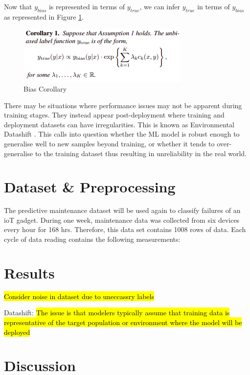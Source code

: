 \documentclass[a4paper,12pt]{report}
\begin{document}
Now that $y_{bias}$ is represented in terms of $y_{true}$, we can infer $y_{true}$ in terms of $y_{bias}$ as represented in Figure \ref{fig:Corollary}.

\begin{figure}[h]
    \includegraphics[scale =0.8]{corollary.png}
    \centering
    \caption{Bias Corollary \cite{Jiang}}
    \label{fig:Corollary}
\end{figure}

There may be situations where performance issues may not be apparent during training stages. 
They instead appear post-deployment where training and deployment datasets can have irregularities. 
This is known as Environmental Datashift \cite{saria2019tutorial}. 
This calls into question whether the ML model is robust enough to generalise well to new samples beyond training, or whether it tends to over-generalise to the training dataset thus resulting in unreliability in the real world.


\section{Dataset \& Preprocessing}
The predictive maintenance dataset will be used again to classify failures of an ioT gadget.
During one week, maintenance data was collected from six devices every hour for 168 hrs.
Therefore, this data set contains 1008 rows of data. 
Each cycle of data reading contains the following measurements: 

\section{Results}
\hl{Consider noise in dataset due to uneccassry labels}

Datashift:
\hl{The issue is that modelers typically assume that training data
is representative of the target population or environment where
the model will be deployed} \cite{saria2019tutorial}

\section{Discussion}
\end{document}
